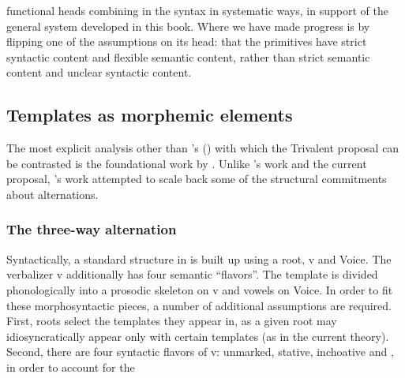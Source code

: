 \begin{exe}
\begin{xlist}
\begin{xlist}
\begin{exe}
\begin{xlist}
\begin{xlist}
\begin{exe}
\begin{xlist}
\begin{xlist}
\begin{exe}
\begin{exe}
\begin{xlist}
\begin{exe}
\begin{exe}
\begin{xlist}
\begin{exe}
\begin{exe}
\begin{exe}
\begin{exe}
\begin{exe}
\begin{xlist}
\begin{exe}
\begin{xlist}
\begin{exe}
\begin{exe}
\begin{xlist}
\begin{exe}
\begin{xlist}
\begin{exe}
\begin{exe}
\begin{exe}
\begin{xlist}
\begin{exe}
\begin{exe}
\begin{exe}
\begin{xlist}
\begin{exe}
\begin{xlist}
\begin{exe}
\begin{xlist}
\begin{exe}
\begin{xlist}
\begin{exe}
\begin{exe}
\begin{exe}
\begin{exe}
\begin{xlist}
\begin{exe}
\begin{xlist}
\begin{exe}
\begin{xlist}
\begin{exe}
\begin{xlist}
\begin{exe}
\begin{xlist}
\begin{exe}
\begin{xlist}
\begin{exe}
\begin{exe}
\begin{exe}
\begin{exe}
\begin{xlist}
\begin{exe}
\begin{xlist}
\begin{exe}
\begin{xlist}
\begin{exe}
\begin{exe}
\begin{xlist}
\begin{exe}
\begin{exe}
\begin{exe}
\begin{exe}
\begin{xlist}
\begin{xlist}
\begin{exe}
\begin{xlist}
\begin{exe}
\begin{exe}
\begin{exe}
\begin{xlist}
\begin{exe}
\begin{exe}
\begin{xlist}
\begin{exe}
\begin{exe}
\begin{exe}
\begin{xlist}
\begin{xlist}
\begin{exe}
\begin{xlist}
\begin{exe}
\begin{exe}
\begin{exe}
\begin{exe}
\begin{xlist}
\begin{exe}
\begin{xlist}
\begin{exe}
\begin{xlist}
\begin{exe}
\begin{exe}
\begin{exe}
\begin{exe}
\begin{exe}
\begin{exe}
\begin{xlist}
\begin{exe}
\begin{xlist}
\begin{exe}
\begin{xlist}
\begin{exe}
\begin{xlist}
\begin{exe}
\begin{xlist}
\begin{exe}
\begin{xlist}
functional heads combining in the syntax in systematic ways, in support of the general system developed in this book. Where we have made progress is by flipping one of the assumptions on its head: that the primitives have strict syntactic content and flexible semantic content, rather than strict semantic content and unclear syntactic content.
	\subsection{Templates as morphemic elements} \label{vz:others:morph}
The most explicit analysis other than \citeauthor{doron03}'s (\citeyear{doron03}) with which the Trivalent proposal can be contrasted is the foundational work by \cite{arad03,arad05}. Unlike \citeauthor{doron03}'s work and the current proposal, \cite{arad05}'s work attempted to scale back some of the structural commitments about alternations.

		\subsubsection{The three-way alternation}
Syntactically, a standard structure in \cite{arad05} is built up using a root, v and Voice. The verbalizer v additionally has four semantic ``flavors''. The template is divided phonologically into a prosodic skeleton on v and vowels on Voice. In order to fit these morphosyntactic pieces, a number of additional assumptions are required. First, roots select the templates they appear in, as a given root may idiosyncratically appear only with certain templates (as in the current theory). Second, there are four syntactic flavors of v: unmarked, stative, inchoative and , in order to account for the 
\end{xlist}
\end{exe}
\end{xlist}
\end{exe}
\end{xlist}
\end{exe}
\end{xlist}
\end{exe}
\end{xlist}
\end{exe}
\end{xlist}
\end{exe}
\end{exe}
\end{exe}
\end{exe}
\end{exe}
\end{exe}
\end{xlist}
\end{exe}
\end{xlist}
\end{exe}
\end{xlist}
\end{exe}
\end{exe}
\end{exe}
\end{exe}
\end{xlist}
\end{exe}
\end{xlist}
\end{xlist}
\end{exe}
\end{exe}
\end{exe}
\end{xlist}
\end{exe}
\end{exe}
\end{xlist}
\end{exe}
\end{exe}
\end{exe}
\end{xlist}
\end{exe}
\end{xlist}
\end{xlist}
\end{exe}
\end{exe}
\end{exe}
\end{exe}
\end{xlist}
\end{exe}
\end{exe}
\end{xlist}
\end{exe}
\end{xlist}
\end{exe}
\end{xlist}
\end{exe}
\end{exe}
\end{exe}
\end{exe}
\end{xlist}
\end{exe}
\end{xlist}
\end{exe}
\end{xlist}
\end{exe}
\end{xlist}
\end{exe}
\end{xlist}
\end{exe}
\end{xlist}
\end{exe}
\end{exe}
\end{exe}
\end{exe}
\end{xlist}
\end{exe}
\end{xlist}
\end{exe}
\end{xlist}
\end{exe}
\end{xlist}
\end{exe}
\end{exe}
\end{exe}
\end{xlist}
\end{exe}
\end{exe}
\end{exe}
\end{xlist}
\end{exe}
\end{xlist}
\end{exe}
\end{exe}
\end{xlist}
\end{exe}
\end{xlist}
\end{exe}
\end{exe}
\end{exe}
\end{exe}
\end{exe}
\end{xlist}
\end{exe}
\end{exe}
\end{xlist}
\end{exe}
\end{exe}
\end{xlist}
\end{xlist}
\end{exe}
\end{xlist}
\end{xlist}
\end{exe}
\end{xlist}
\end{xlist}
\end{exe}

